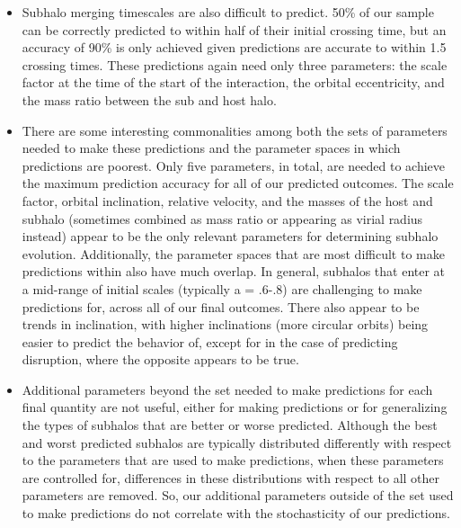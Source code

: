 \documentclass[fleqn,usenatbib]{mnras}
\begin{document}
\begin{itemize}
    \item Subhalo merging timescales are also difficult to predict. 50\% of our sample can be correctly predicted to within half of their initial crossing time, but an accuracy of 90\% is only achieved given predictions are accurate to within 1.5 crossing times. These predictions again need only three parameters: the scale factor at the time of the start of the interaction, the orbital eccentricity, and the mass ratio between the sub and host halo. 
    \item There are some interesting commonalities among both the sets of parameters needed to make these predictions and the parameter spaces in which predictions are poorest. Only five parameters, in total, are needed to achieve the maximum prediction accuracy for all of our predicted outcomes. The scale factor, orbital inclination, relative velocity, and the masses of the host and subhalo (sometimes combined as mass ratio or appearing as virial radius instead) appear to be the only relevant parameters for determining subhalo evolution. Additionally, the parameter spaces that are most difficult to make predictions within also have much overlap. In general, subhalos that enter at a mid-range of initial scales (typically a = .6-.8) are challenging to make predictions for, across all of our final outcomes. There also appear to be trends in inclination, with higher inclinations (more circular orbits) being easier to predict the behavior of, except for in the case of predicting disruption, where the opposite appears to be true.
    \item Additional parameters beyond the set needed to make predictions for each final quantity are not useful, either for making predictions or for generalizing the types of subhalos that are better or worse predicted. Although the best and worst predicted subhalos are typically distributed differently with respect to the parameters that are used to make predictions, when these parameters are controlled for, differences in these distributions with respect to all other parameters are removed. So, our additional parameters outside of the set used to make predictions do not correlate with the stochasticity of our predictions.
\end{itemize}
\end{document}
